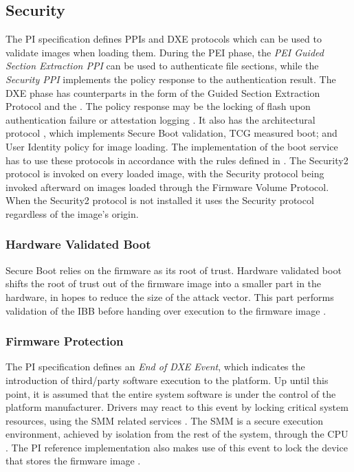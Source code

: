 
\subsection{Security}
\label{sec:uefi-pi:pi:security}

The \ac{PI} specification defines \acp{PPI} and \ac{DXE} protocols which can be used to validate images when loading them.
During the \ac{PEI} phase, the \emph{\ac{PEI} Guided Section Extraction \ac{PPI}} can be used to authenticate file sections, while the \emph{Security \ac{PPI}} implements the policy response to the authentication result.
The \ac{DXE} phase has counterparts in the form of the Guided Section Extraction Protocol and the .
The policy response may be the locking of flash upon authentication failure or attestation logging \cite[Vol. 2, Section 12.9.1]{pi-spec}.
It also has the architectural protocol , which implements Secure Boot validation, \ac{TCG} measured boot; and User Identity policy for image loading.
The implementation of the boot service  has to use these protocols in accordance with the rules defined in \cite[Vol. 2, Section 12.9.2]{pi-spec}.
The Security2 protocol is invoked on every loaded image, with the Security protocol being invoked afterward on images loaded through the Firmware Volume Protocol.
When the Security2 protocol is not installed it uses the Security protocol regardless of the image's origin.

\subsubsection{Hardware Validated Boot}

Secure Boot relies on the firmware as its root of trust.
Hardware validated boot shifts the root of trust out of the firmware image into a smaller part in the hardware, in hopes to reduce the size of the attack vector.
This part performs validation of the \ac{IBB} before handing over execution to the firmware image \cite{tianocore-understanding-uefi-secure-boot-chain}.

\subsubsection{Firmware Protection}

The \ac{PI} specification defines an \emph{End of \acs{DXE} Event}, which indicates the introduction of third\-/party software execution to the platform.
Up until this point, it is assumed that the entire system software is under the control of the platform manufacturer.
Drivers may react to this event by locking critical system resources, using the \ac{SMM} related services \cite[Vol. 2, 5.1.2.1]{pi-spec}.
The \ac{SMM} is a secure execution environment, achieved by isolation from the rest of the system, through the \ac{CPU} \cite[Vol. 4, Section 1.3]{pi-spec}.
The \ac{PI} reference implementation also makes use of this event to lock the device that stores the firmware image \cite{tianocore-edk2-fmpdxe}.
